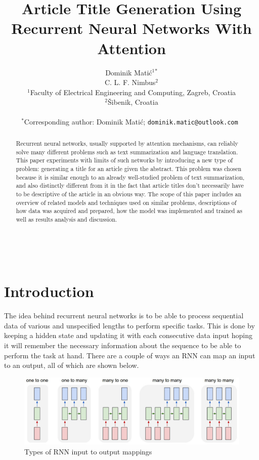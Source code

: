 \documentclass{article}
\title{Article Title Generation Using Recurrent Neural Networks With Attention}
\author{Dominik Matić$^{1}$$^{*}$\\
        C. L. F. Nimbus$^{2}$\\
        \small $^{1}$Faculty of Electrical Engineering and Computing, Zagreb, Croatia \\
        \small $^{2}$Šibenik, Croatia \\\\
        \small $^{*}$Corresponding author: Dominik Matić; \tt{dominik.matic@outlook.com}
}
\date{} %
\begin{document}
\maketitle

\begin{abstract} 
\noindent Recurrent neural networks, usually supported by attention mechanisms, can reliably solve many different problems such as text summarization and language translation. This paper experiments with limits of such networks by introducing a new type of problem: generating a title for an article given the abstract. This problem was chosen because it is similar enough to an already well-studied problem of text summarization, and also distinctly different from it in the fact that article titles don't necessarily have to be descriptive of the article in an obvious way. The scope of this paper includes an overview of related models and techniques used on similar problems, descriptions of how data was acquired and prepared, how the model was implemented and trained as well as results analysis and discussion.
\end{abstract}

\noindent{}\\


\section{Introduction}

The idea behind recurrent neural networks is to be able to process sequential data of various and unspecified lengths to perform specific tasks. This is done by keeping a hidden state and updating it with each consecutive data input hoping it will remember the necessary information about the sequence to be able to perform the task at hand. There are a couple of ways an RNN can map an input to an output, all of which are shown below.

\begin{figure}[H]
    \centering
    \includegraphics[scale=0.33]{images/inpoutp.jpeg}
    \caption{Types of RNN input to output mappings \citep{karpathy}}
\end{figure}
\end{document}

